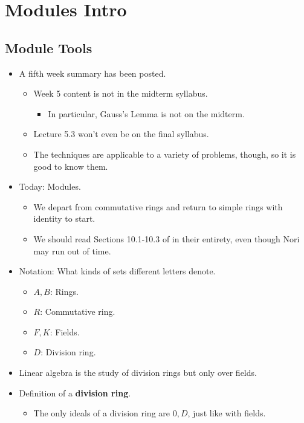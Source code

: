 \documentclass[../notes.tex]{subfiles}
\begin{document}
\chapter{Modules Intro}
\section{Module Tools}
\begin{itemize}
    \item {}A fifth week summary has been posted.
    \begin{itemize}
        \item Week 5 content is not in the midterm syllabus.
        \begin{itemize}
            \item In particular, Gauss's Lemma is not on the midterm.
        \end{itemize}
        \item Lecture 5.3 won't even be on the final syllabus.
        \item The techniques are applicable to a variety of problems, though, so it is good to know them.
    \end{itemize}
    \item Today: Modules.
    \begin{itemize}
        \item We depart from commutative rings and return to simple rings with identity to start.
        \item We should read Sections 10.1-10.3 of \textcite{bib:DummitFoote} in their entirety, even though Nori may run out of time.
    \end{itemize}
    \item Notation: What kinds of sets different letters denote.
    \begin{itemize}
        \item $A,B$: Rings.
        \item $R$: Commutative ring.
        \item $F,K$: Fields.
        \item $D$: Division ring.
    \end{itemize}
    \item Linear algebra is the study of division rings but only over fields.
    \item Definition of a \textbf{division ring}.
    \begin{itemize}
        \item The only ideals of a division ring are $0,D$, just like with fields.

\end{itemize}
\end{itemize}
\end{document}
